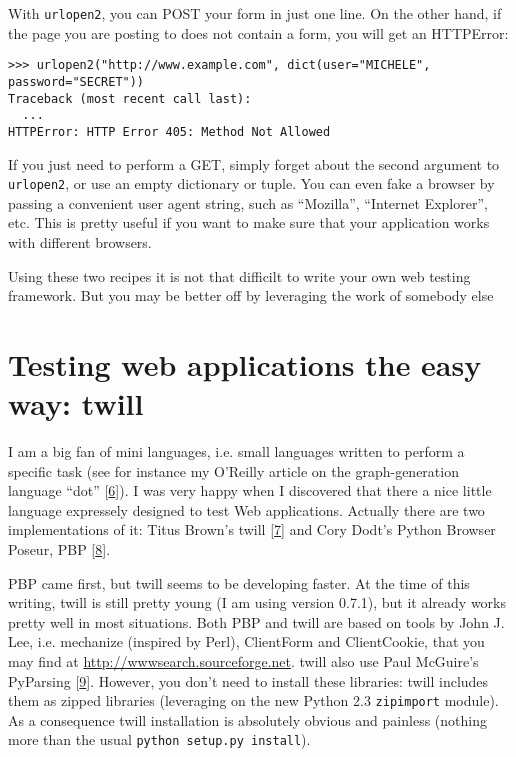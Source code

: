 \documentclass[10pt,a4paper,english]{article}
\begin{document}
With \texttt{urlopen2}, you can POST your form in just one line. 
On the other hand, if the page you are posting to does not contain a form, 
you will get an HTTPError:
\begin{verbatim}>>> urlopen2("http://www.example.com", dict(user="MICHELE", password="SECRET"))
Traceback (most recent call last):
  ...  
HTTPError: HTTP Error 405: Method Not Allowed\end{verbatim}

If you just need to perform a GET, simply forget about the second argument
to \texttt{urlopen2}, or use an empty dictionary or tuple. You can even fake a 
browser by passing a convenient user agent string, such as
``Mozilla'', ``Internet Explorer'', etc. This is pretty useful if you want
to make sure that your application works with different browsers.

Using these two recipes it is not that difficilt to write your own web 
testing framework. But you may be better off by leveraging the work
of somebody else



\hypertarget{testing-web-applications-the-easy-way-twill}{}
\section*{Testing web applications the easy way: twill}

I am a big fan of mini languages, i.e. small languages
written to perform a specific task (see for instance my O'Reilly article
on the graph-generation language ``dot'' [\hyperlink{id16}{6}]). I was very happy when I 
discovered that there a nice little language expressely designed to test 
Web applications. Actually there are two implementations of it: Titus Brown's
twill [\hyperlink{id17}{7}] and Cory Dodt's Python Browser Poseur, PBP  [\hyperlink{id18}{8}].

PBP came first, but twill seems to be developing faster. At the time 
of this writing, twill is still pretty young (I am using 
version 0.7.1), but it already works pretty well in most situations.
Both PBP and twill are based on tools by 
John J. Lee, i.e. mechanize (inspired by Perl), ClientForm and ClientCookie,
that you may find at \href{http://wwwsearch.sourceforge.net}{http://wwwsearch.sourceforge.net}. twill also use
Paul McGuire's PyParsing [\hyperlink{id19}{9}]. However, you don't need to install these
libraries: twill includes them as zipped libraries (leveraging on the 
new Python 2.3 \texttt{zipimport} module). As a consequence twill installation 
is absolutely obvious and painless (nothing more than the usual
\texttt{python setup.py install}).
\end{document}
